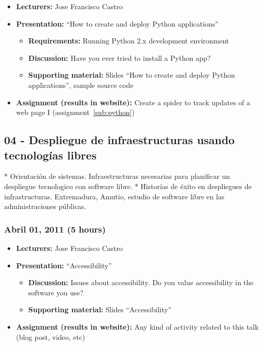 \documentclass[a4paper]{article}
\begin{document}
\begin{itemize}
\item \textbf{Lecturers:} Jose Francisco Castro
\item \textbf{Presentation:} ``How to create and deploy Python applications''
  \begin{itemize}
\item \textbf{Requirements:} Running Python 2.x development environment
  \item \textbf{Discussion:} Have you ever tried to install a Python app?
  \item \textbf{Supporting material:} Slides ``How to create and
    deploy Python applications'', sample source code
  \end{itemize}
\item \textbf{Assignment (results in website):} Create a spider to
  track updates of a web page I (assignment~\ref{sub:python})
\end{itemize}



\subsection{04 - Despliegue de infraestructuras usando tecnologías libres}

 * Orientación de sistemas. Infraestructuras necesarias para planificar un despliegue tecnologico con software libre. 
 * Historías de éxito en despliegues de infrastructuras. Extremadura, Amutio, estudio de software libre en las administraciones públicas.

\subsubsection{Abril 01, 2011 (5 hours)}

\begin{itemize}
\item \textbf{Lecturers:} Jose Francisco Castro
\item \textbf{Presentation:} ``Accessibility''
  \begin{itemize}
  \item \textbf{Discussion:} Issues about accessibility. Do you value
    accessibility in the software you use?
  \item \textbf{Supporting material:} Slides ``Accessibility''
  \end{itemize}
\item \textbf{Assignment (results in website):} Any kind of activity
  related to this talk (blog post, video, etc)
\end{itemize}
\end{document}
